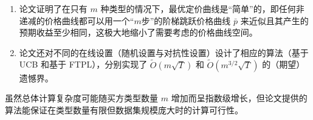 \begin{enumerate}
    \item 论文证明了在只有 $m$ 种类型的情况下，最优定价曲线是“简单”的，即任何非递减的价格曲线都可以用一个“$m$步”的阶梯跳跃价格曲线 $\bar{p}$ 来近似且其产生的预期收益至少相同，这极大地缩小了需要考虑的价格曲线空间。
    \item 论文还对不同的在线设置（随机设置与对抗性设置）设计了相应的算法（基于 UCB 和基于 FTPL），分别实现了 $\tilde{O}(m\sqrt{T})$ 和 $\tilde{O}(m^{3/2}\sqrt{T})$ 的（期望）遗憾界。
\end{enumerate}

虽然总体计算复杂度可能随买方类型数量 $m$ 增加而呈指数级增长，但论文提供的算法能保证在类型数量有限但数据集规模庞大时的计算可行性。
